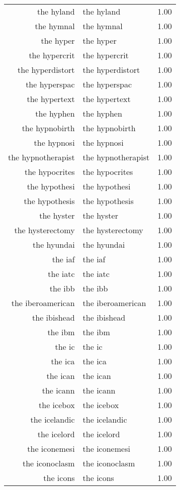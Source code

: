 \begin{table}[ht]
\begin{tabular}{rlr}
  the hyland & the hyland & 1.00 \\ 
  the hymnal & the hymnal & 1.00 \\ 
  the hyper & the hyper & 1.00 \\ 
  the hypercrit & the hypercrit & 1.00 \\ 
  the hyperdistort & the hyperdistort & 1.00 \\ 
  the hyperspac & the hyperspac & 1.00 \\ 
  the hypertext & the hypertext & 1.00 \\ 
  the hyphen & the hyphen & 1.00 \\ 
  the hypnobirth & the hypnobirth & 1.00 \\ 
  the hypnosi & the hypnosi & 1.00 \\ 
  the hypnotherapist & the hypnotherapist & 1.00 \\ 
  the hypocrites & the hypocrites & 1.00 \\ 
  the hypothesi & the hypothesi & 1.00 \\ 
  the hypothesis & the hypothesis & 1.00 \\ 
  the hyster & the hyster & 1.00 \\ 
  the hysterectomy & the hysterectomy & 1.00 \\ 
  the hyundai & the hyundai & 1.00 \\ 
  the iaf & the iaf & 1.00 \\ 
  the iatc & the iatc & 1.00 \\ 
  the ibb & the ibb & 1.00 \\ 
  the iberoamerican & the iberoamerican & 1.00 \\ 
  the ibishead & the ibishead & 1.00 \\ 
  the ibm & the ibm & 1.00 \\ 
  the ic & the ic & 1.00 \\ 
  the ica & the ica & 1.00 \\ 
  the ican & the ican & 1.00 \\ 
  the icann & the icann & 1.00 \\ 
  the icebox & the icebox & 1.00 \\ 
  the icelandic & the icelandic & 1.00 \\ 
  the icelord & the icelord & 1.00 \\ 
  the iconemesi & the iconemesi & 1.00 \\ 
  the iconoclasm & the iconoclasm & 1.00 \\ 
  the icons & the icons & 1.00 \\ 

\end{tabular}
\end{table}

